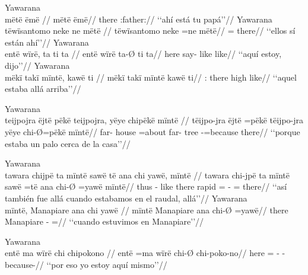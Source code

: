 \documentclass{memoir}
\begin{document}
        \endgl 
    \a Yawarana\\
    \label{convamgu-76}        \begingl
        \glpreamble mëtë ëmë //
        \gla mëtë ëmë//
        \glb there :father://
            \glft ‘‘ahí está tu papá’’//  
        \endgl 
    \a Yawarana\\
    \label{convamgu-89}        \begingl
        \glpreamble tëwïsantomo neke ne mëtë //
        \gla tëwïsantomo neke =ne mëtë//
        \glb {}  = there//
            \glft ‘‘ellos sí están ahí’’//  
        \endgl 
    \a Yawarana\\
    \label{ctorosq-28}        \begingl
        \glpreamble entë wïrë, ta ti ta //
        \gla entë wïrë ta-Ø ti ta//
        \glb here  say- like like//
            \glft ‘‘aquí estoy, dijo’’//  
        \endgl 
    \a Yawarana\\
    \label{ctovarmafl-366}        \begingl
        \glpreamble mëkï takï mïntë, kawë ti //
        \gla mëkï takï mïntë kawë ti//
        \glb {}:  there high like//
            \glft ‘‘aquel estaba allá arriba’’//  
        \endgl 
\xe

\ex Yawarana \\
\label{loc-sub-aff-advpred-nsubj-cop}    \begingl
    \glpreamble teijpojra ëjtë pëkë teijpojra, yëye chipëkë mïntë //
    \gla tëijpo-jra ëjtë =pëkë tëijpo-jra yëye chi-Ø=pëkë mïntë//
    \glb far- house =about far- tree -=because there//
        \glft ‘‘porque estaba un palo cerca de la casa’’//  
    \endgl 
\xe

\pex\label{loc-sub-aff-locpred-cop-nsubj}    \a Yawarana\\
    \label{convfemgrme-99}        \begingl
        \glpreamble tawara chijpë ta mïntë sawë të ana chi yawë, mïntë //
        \gla tawara chi-jpë ta mïntë sawë =të ana chi-Ø =yawë mïntë//
        \glb thus - like there rapid =  - = there//
            \glft ‘‘así también fue allá cuando estabamos en el raudal, allá’’//  
        \endgl 
    \a Yawarana\\
    \label{convfemgrme-157}        \begingl
        \glpreamble mïntë, Manapiare ana chi yawë //
        \gla mïntë Manapiare ana chi-Ø =yawë//
        \glb there Manapiare  - =//
            \glft ‘‘cuando estuvimos en Manapiare’’//  
        \endgl 
\xe

\ex Yawarana \\
\label{loc-sub-aff-part-cop-nsubj}    \begingl
    \glpreamble entë ma wïrë chi chipokono //
    \gla entë =ma wïrë chi-Ø chi-poko-no//
    \glb here =  - -because-//
        \glft ‘‘por eso yo estoy aquí mismo’’//  
    \endgl 
\xe
\end{document}
